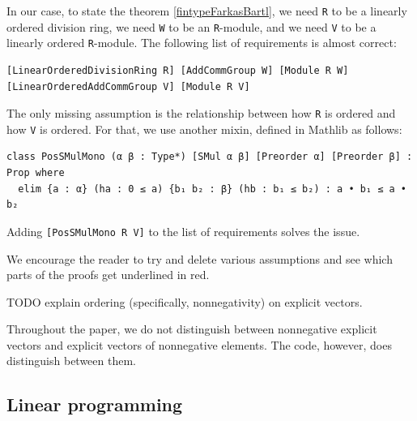 \documentclass[]{article}
\renewcommand{\.}{\hskip .75pt}
\begin{document}
In our case, to state the theorem \ref{fintypeFarkasBartl},
we need \texttt{R} to be a linearly ordered division ring,
we need \texttt{W} to be an \texttt{R}-module, and
we need \texttt{V} to be a linearly ordered \texttt{R}-module.
The following list of requirements is almost correct:
\begin{lstlisting}
[LinearOrderedDivisionRing R] [AddCommGroup W] [Module R W] [LinearOrderedAddCommGroup V] [Module R V]
\end{lstlisting}
The only missing assumption is the relationship between
how \texttt{R} is ordered and how \texttt{V} is ordered.
For that, we use another mixin, defined in Mathlib as follows:
\begin{lstlisting}
class PosSMulMono (α β : Type*) [SMul α β] [Preorder α] [Preorder β] : Prop where
  elim {a : α} (ha : 0 ≤ a) {b₁ b₂ : β} (hb : b₁ ≤ b₂) : a • b₁ ≤ a • b₂
\end{lstlisting}
Adding \texttt{[PosSMulMono R V]} to the list of requirements solves the issue.

We encourage the reader to try and delete various assumptions and see which parts of the proofs
get underlined in red.

{\color{blue}
TODO explain ordering (specifically, nonnegativity) on explicit vectors.
}

Throughout the paper, we do not distinguish between
nonnegative explicit vectors and explicit vectors of nonnegative elements.
The code, however, does distinguish between them.


\subsection{Linear programming}
\end{document}
